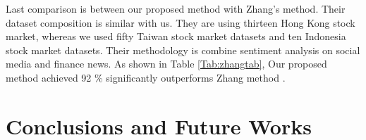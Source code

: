 \documentclass[12pt]{article}
\begin{document}
  \begin{table}[H]
 \centering
 \caption{Comparison result with Zhang.}
 \label{Tab:zhangtab}
 \end{table}
Last comparison is between our proposed method with Zhang's method\cite{zhang2018improving}. Their dataset composition is similar with us. They are using thirteen Hong Kong stock market, whereas we used fifty Taiwan stock market datasets and ten Indonesia stock market datasets. Their methodology is combine sentiment analysis on social media and finance news. As shown in Table \ref{Tab:zhangtab}, Our proposed method achieved 92 \% significantly outperforms Zhang method \cite{zhang2018improving}.
\section{Conclusions and Future Works}
\end{document}

